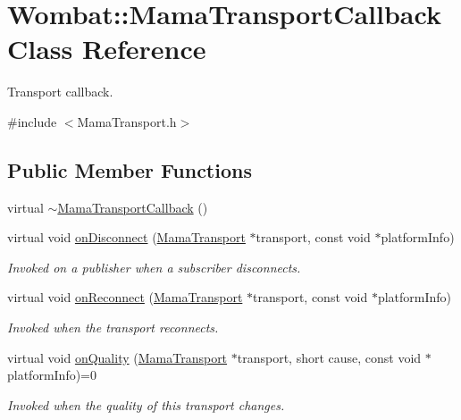 \hypertarget{classWombat_1_1MamaTransportCallback}{
\section{Wombat::MamaTransportCallback Class Reference}
\label{classWombat_1_1MamaTransportCallback}
}


Transport callback.  


{\ttfamily \#include $<$MamaTransport.h$>$}\subsection*{Public Member Functions}
\begin{DoxyCompactItemize}
\item 
virtual \hyperlink{classWombat_1_1MamaTransportCallback_a6407795c8b962a42de85ed67c06483cc}{$\sim$MamaTransportCallback} ()
\item 
virtual void \hyperlink{classWombat_1_1MamaTransportCallback_a911f774a4d7c1ae89e8e4afa0cce09a9}{onDisconnect} (\hyperlink{classWombat_1_1MamaTransport}{MamaTransport} $\ast$transport, const void $\ast$platformInfo)
\begin{DoxyCompactList}\small\item\em Invoked on a publisher when a subscriber disconnects. \item\end{DoxyCompactList}\item 
virtual void \hyperlink{classWombat_1_1MamaTransportCallback_a209c2036256c70eee70b0f3bdbd1a558}{onReconnect} (\hyperlink{classWombat_1_1MamaTransport}{MamaTransport} $\ast$transport, const void $\ast$platformInfo)
\begin{DoxyCompactList}\small\item\em Invoked when the transport reconnects. \item\end{DoxyCompactList}\item 
virtual void \hyperlink{classWombat_1_1MamaTransportCallback_a87ae633ef0a08074178173b5901224cc}{onQuality} (\hyperlink{classWombat_1_1MamaTransport}{MamaTransport} $\ast$transport, short cause, const void $\ast$platformInfo)=0
\begin{DoxyCompactList}\small\item\em Invoked when the quality of this transport changes. \item\end{DoxyCompactList}\item 

\end{DoxyCompactItemize}
